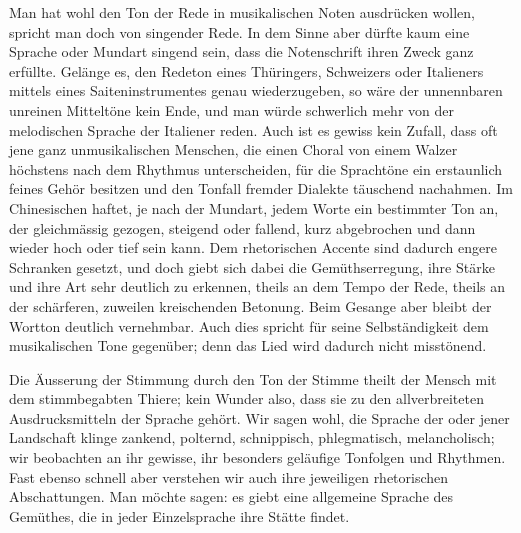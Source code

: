 Man hat wohl den Ton der Rede in musikalischen Noten ausdrücken wollen, spricht man doch von singender Rede. In dem Sinne aber dürfte kaum eine Sprache oder Mundart singend sein, dass die Notenschrift ihren Zweck ganz erfüllte. Gelänge es, den Redeton eines Thüringers, \label{fp.362} Schweizers oder Italieners mittels eines Saiteninstrumentes genau wiederzugeben, so wäre der unnennbaren unreinen Mitteltöne kein Ende, und man würde schwerlich mehr von der melodischen Sprache der Italiener reden. Auch ist es gewiss kein Zufall, dass oft jene ganz unmusikalischen Menschen, die einen Choral von einem Walzer höchstens nach dem Rhythmus unterscheiden, für die Sprachtöne ein erstaunlich feines Gehör besitzen und den Tonfall fremder Dialekte täuschend nachahmen. Im Chinesischen haftet, je nach der Mundart, jedem Worte ein bestimmter Ton an, der gleichmässig gezogen, steigend oder fallend, kurz abgebrochen und dann wieder hoch oder tief sein kann. Dem rhetorischen Accente sind dadurch engere Schranken gesetzt, und doch giebt sich dabei die Gemüthserregung, ihre Stärke und ihre Art sehr deutlich zu erkennen, theils an dem Tempo der Rede, theils an der schärferen, zuweilen kreischenden Betonung. Beim Gesange aber bleibt der Wortton deutlich vernehmbar. Auch dies spricht für seine Selbständigkeit dem musikalischen Tone gegenüber; denn das Lied wird dadurch nicht misstönend.

Die Äusserung der Stimmung durch den Ton der Stimme theilt der Mensch mit dem stimmbegabten Thiere; kein Wunder also, dass sie zu den allverbreiteten Ausdrucksmitteln der Sprache gehört. Wir sagen wohl, die Sprache der oder jener Landschaft klinge zankend, polternd, schnippisch, phlegmatisch, melancholisch; wir beobachten an ihr gewisse, ihr besonders geläufige Tonfolgen und \label{sp.378} Rhythmen. Fast ebenso schnell aber verstehen wir auch ihre jeweiligen rhetorischen Abschattungen. Man möchte sagen: es giebt eine allgemeine Sprache des Gemüthes, die in jeder Einzelsprache ihre Stätte findet.

